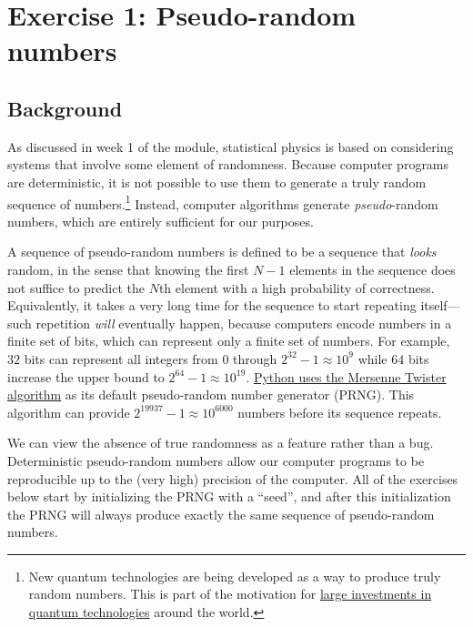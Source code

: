 \documentclass[12 pt]{article} %
\begin{document}
\section*{Exercise 1: Pseudo-random numbers}
\subsection*{Background}
As discussed in week 1 of the module, statistical physics is based on considering systems that involve some element of randomness.
Because computer programs are deterministic, it is not possible to use them to generate a truly random sequence of numbers.\footnote{New quantum technologies are being developed as a way to produce truly random numbers.  This is part of the motivation for \href{https://uknqt.ukri.org}{large investments in quantum technologies} around the world.}
Instead, computer algorithms generate \textit{pseudo}-random numbers, which are entirely sufficient for our purposes.

A sequence of pseudo-random numbers is defined to be a sequence that \textit{looks} random, in the sense that knowing the first $N - 1$ elements in the sequence does not suffice to predict the $N$th element with a high probability of correctness.
Equivalently, it takes a very long time for the sequence to start repeating itself---such repetition \textit{will} eventually happen, because computers encode numbers in a finite set of bits, which can represent only a finite set of numbers.
For example, $32$ bits can represent all integers from $0$ through \href{https://en.wikipedia.org/wiki/4,294,967,295}{$2^{32} - 1 \approx 10^9$} while $64$ bits increase the upper bound to $2^{64} - 1 \approx 10^{19}$.
\href{https://docs.python.org/3/library/random.html}{Python uses the Mersenne Twister algorithm} as its default pseudo-random number generator (PRNG).
This algorithm can provide $2^{19937} - 1 \approx 10^{6000}$ numbers before its sequence repeats.

We can view the absence of true randomness as a feature rather than a bug.
Deterministic pseudo-random numbers allow our computer programs to be reproducible up to the (very high) precision of the computer.
All of the exercises below start by initializing the PRNG with a ``seed'', and after this initialization the PRNG will always produce exactly the same sequence of pseudo-random numbers.
\end{document}
